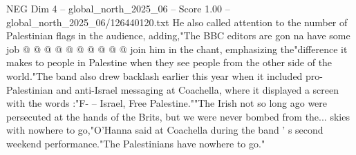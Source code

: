 \begin{textsample}{NEG Dim 4 – global\_north\_2025\_06 – Score 1.00 – global\_north\_2025\_06/126440120.txt}
He also called attention to the number of Palestinian flags in the audience, adding,"The BBC editors are gon na have some job @ @ @ @ @ @ @ @ @ @ join him in the chant, emphasizing the"difference it makes to people in Palestine when they see people from the other side of the world."The band also drew backlash earlier this year when it included pro-Palestinian and anti-Israel messaging at Coachella, where it displayed a screen with the words :"F- -- Israel, Free Palestine.""The Irish not so long ago were persecuted at the hands of the Brits, but we were never bombed from the... skies with nowhere to go,"O'Hanna said at Coachella during the band ' s second weekend performance."The Palestinians have nowhere to go."

\end{textsample}
